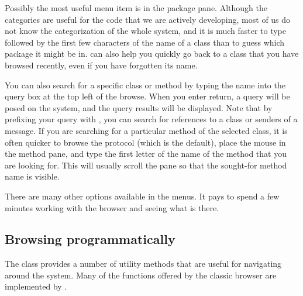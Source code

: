 \documentclass[a4paper,10pt,twoside]{book}
\begin{document}
Possibly the most useful menu item is  in the package pane.  Although the categories are useful for the code that we are actively developing, most of us do not know the categorization of the whole system, and it is much faster to type  followed by the first few characters of the name of a class than to guess which package it might be in.   can also help you quickly go back to a class that you have browsed recently, even if you have forgotten its name.

You can also search for a specific class or method by typing the name into the query box at the top left of the browse.  When you enter return, a query will be posed on the system, and the query results will be displayed.  Note that by prefixing your query with \ct{#}, you can search for references to a class or senders of a message.
If you are searching for a particular method of the selected class, it is often quicker to browse the  protocol (which is the default), place the mouse in the method pane, and type the first letter of the name of the method that you are looking for.
This will usually scroll the pane so that the sought-for method name is visible.


There are many other options available in the menus.  It pays to spend a few minutes working with the browser and seeing what is there.   


\subsection{Browsing programmatically}

The class  provides a number of utility methods that are useful for navigating around the system.
Many of the functions offered by the classic browser are implemented by .
\end{document}
